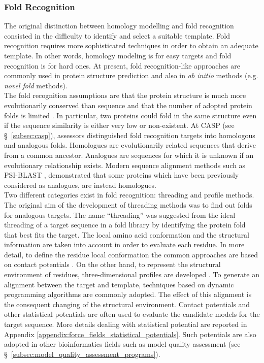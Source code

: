 \subsubsection{Fold Recognition}
\label{subsubsec:fold_recognition}
The original distinction between homology modelling and fold recognition consisted in the difficulty to identify and select a suitable template. Fold recognition requires more sophisticated techniques in order to obtain an adequate template. In other words, homology modeling is for easy targets and fold recognition is for hard ones. At present, fold recognition-like approaches are commonly used in protein structure prediction and also in \emph{ab initio} methods (e.g. \emph{novel fold} methods).\\
The fold recognition assumptions are that the protein structure is much more evolutionarily conserved than sequence \cite{Chothia1986aa} and that the number of adopted protein folds is limited \cite{Chothia1992aa}. In particular, two proteins could fold in the same structure even if the sequence similarity is either very low or non-existent.
At CASP (see \S~\ref{subsec:casp}), assessors distinguished fold recognition targets into homologous and analogous folds. Homologues are evolutionarily related sequences that derive from a common ancestor. Analogues are sequences for which it is unknown if an evolutionary relationship exists. Modern sequence alignment methods such as PSI-BLAST \cite{Altschul1997aa}, demonstrated that some proteins which have been previously considered as analogues, are instead homologues.\\
Two different categories exist in fold recognition: threading and profile methods. The original aim of the development of threading methods was to find out folds for analogous targets. The name ``threading'' was suggested from the ideal threading of a target sequence in a fold library by identifying the protein fold that best fits the target. The local amino acid conformation and the structural information are taken into account in order to evaluate each residue. In more detail, to define the residue local conformation the common approaches are based on contact potentials \cite{Jones1992aa, Sippl1990aa}. On the other hand, to represent the structural environment of residues, three-\-di\-men\-sio\-nal profiles  are developed \cite{Bowie1991aa}. To generate an alignment between the target and template, techniques based on dynamic programming algorithms are commonly adopted. The effect of this alignment is the consequent changing of the structural environment. Contact potentials \cite{Pollastri2001aa} and other statistical potentials \cite{Jernigan1996aa} are often used to evaluate the candidate models for the target sequence. More details dealing with statistical potential are reported in Appendix \ref{appendix:force_fields_statistical_potentials}. Such potentials are also adopted in other bioinformatics fields such as model quality assessment (see \S~\ref{subsec:model_quality_assessment_programs}).\\

